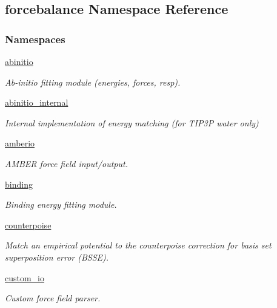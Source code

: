 \hypertarget{namespaceforcebalance}{}\subsection{forcebalance Namespace Reference}
\label{namespaceforcebalance}
\subsubsection*{Namespaces}
\begin{DoxyCompactItemize}
\item 
 \hyperlink{namespaceforcebalance_1_1abinitio}{abinitio}
\begin{DoxyCompactList}\small\item\em Ab-\/initio fitting module (energies, forces, resp). \end{DoxyCompactList}\item 
 \hyperlink{namespaceforcebalance_1_1abinitio__internal}{abinitio\+\_\+internal}
\begin{DoxyCompactList}\small\item\em Internal implementation of energy matching (for T\+I\+P3P water only) \end{DoxyCompactList}\item 
 \hyperlink{namespaceforcebalance_1_1amberio}{amberio}
\begin{DoxyCompactList}\small\item\em A\+M\+B\+ER force field input/output. \end{DoxyCompactList}\item 
 \hyperlink{namespaceforcebalance_1_1binding}{binding}
\begin{DoxyCompactList}\small\item\em Binding energy fitting module. \end{DoxyCompactList}\item 
 \hyperlink{namespaceforcebalance_1_1counterpoise}{counterpoise}
\begin{DoxyCompactList}\small\item\em Match an empirical potential to the counterpoise correction for basis set superposition error (B\+S\+SE). \end{DoxyCompactList}\item 
 \hyperlink{namespaceforcebalance_1_1custom__io}{custom\+\_\+io}
\begin{DoxyCompactList}\small\item\em Custom force field parser. \end{DoxyCompactList}\item 

\end{DoxyCompactItemize}
